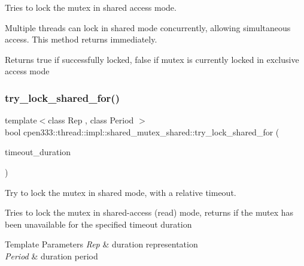 Tries to lock the mutex in shared access mode. 

Multiple threads can lock in shared mode concurrently, allowing simultaneous access. This method returns immediately.

\begin{DoxyReturn}{Returns}
true if successfully locked, false if mutex is currently locked in exclusive access mode 
\end{DoxyReturn}
\mbox{\label{classcpen333_1_1thread_1_1impl_1_1shared__mutex__shared_a12d65f5e71f62d44ca910a1bf8831f13}} 
\subsubsection{\texorpdfstring{try\+\_\+lock\+\_\+shared\+\_\+for()}{try\_lock\_shared\_for()}}
{\footnotesize\ttfamily template$<$class Rep , class Period $>$ \\
bool cpen333\+::thread\+::impl\+::shared\+\_\+mutex\+\_\+shared\+::try\+\_\+lock\+\_\+shared\+\_\+for (\begin{DoxyParamCaption}\item[{const std\+::chrono\+::duration$<$ Rep, Period $>$ \&}]{timeout\+\_\+duration }\end{DoxyParamCaption})\hspace{0.3cm}{\ttfamily [inline]}}



Try to lock the mutex in shared mode, with a relative timeout. 

Tries to lock the mutex in shared-\/access (read) mode, returns if the mutex has been unavailable for the specified timeout duration


\begin{DoxyTemplParams}{Template Parameters}
{\em Rep} & duration representation \\
\hline
{\em Period} & duration period \\
\hline
\end{DoxyTemplParams}

